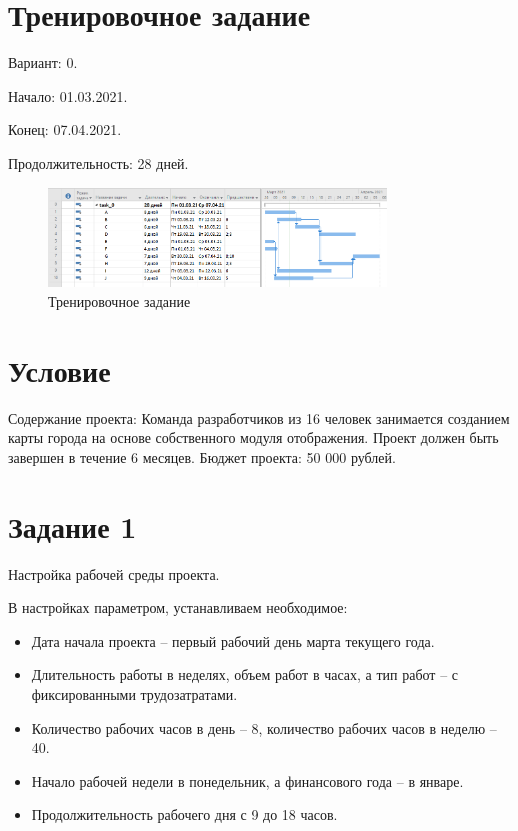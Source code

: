 \section{Тренировочное задание}

Вариант: 0.

Начало: 01.03.2021.

Конец: 07.04.2021.

Продолжительность: 28 дней.

\begin{figure}[H]
	\centering
	\includegraphics[width=0.8\textwidth]{img/content/task_0.png}
	\caption{Тренировочное задание}
\end{figure}

\section{Условие}

Содержание проекта: Команда разработчиков из 16 человек занимается созданием карты города на основе собственного модуля отображения. Проект должен быть завершен в течение 6 месяцев. Бюджет проекта: 50 000 рублей.


\section{Задание 1}

Настройка рабочей среды проекта.

В настройках параметром, устанавливаем необходимое:

\begin{itemize}
	\item Дата начала проекта -- первый рабочий день марта текущего года.
	\item Длительность работы в неделях, объем работ в часах, а тип работ -- с фиксированными трудозатратами.
	\item Количество рабочих часов в день -- 8, количество рабочих часов в неделю -- 40.
	\item Начало рабочей недели в понедельник, а финансового года -- в январе.
	\item Продолжительность рабочего дня с 9 до 18 часов.
\end{itemize}

